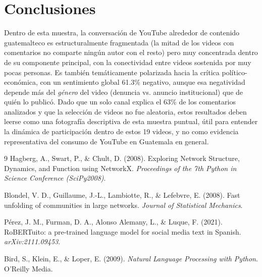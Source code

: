\documentclass[11pt]{article}
\begin{document}
\section{Conclusiones}

Dentro de esta muestra, la conversaci\'on de YouTube alrededor de contenido
guatemalteco es estructuralmente fragmentada (la mitad de los videos con comentarios
no comparte ning\'un autor con el resto) pero muy concentrada dentro de su componente
principal, con la conectividad entre videos sostenida por muy pocas personas. Es
tambi\'en tem\'aticamente polarizada hacia la cr\'itica pol\'itico-econ\'omica, con un
sentimiento global 61.3\% negativo, aunque esa negatividad depende m\'as del
\emph{g\'enero} del video (denuncia vs. anuncio institucional) que de qui\'en lo
public\'o. Dado que un solo canal explica el 63\% de los comentarios analizados y que
la selecci\'on de videos no fue aleatoria, estos resultados deben leerse como una
fotograf\'ia descriptiva de esta muestra puntual, \'util para entender la din\'amica de
participaci\'on dentro de estos 19 videos, y no como evidencia representativa del
consumo de YouTube en Guatemala en general.

\begin{thebibliography}{9}
Hagberg, A., Swart, P., \& Chult, D. (2008). Exploring Network Structure, Dynamics,
and Function using NetworkX. \emph{Proceedings of the 7th Python in Science
Conference (SciPy2008)}.

Blondel, V. D., Guillaume, J.-L., Lambiotte, R., \& Lefebvre, E. (2008). Fast
unfolding of communities in large networks. \emph{Journal of Statistical Mechanics}.

P\'erez, J. M., Furman, D. A., Alonso Alemany, L., \& Luque, F. (2021). RoBERTuito: a
pre-trained language model for social media text in Spanish. \emph{arXiv:2111.09453}.

Bird, S., Klein, E., \& Loper, E. (2009). \emph{Natural Language Processing with
Python}. O'Reilly Media.
\end{thebibliography}
\end{document}
